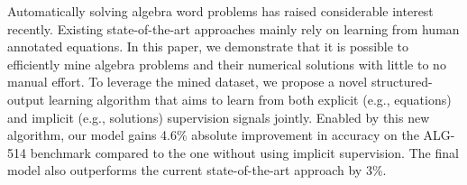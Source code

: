Automatically solving algebra word problems has raised considerable interest recently. Existing state-of-the-art approaches mainly rely on learning from human annotated equations. In this paper, we demonstrate that it is possible to efficiently mine algebra problems and their numerical solutions with little to no manual effort. To leverage the mined dataset, we propose a novel structured-output learning algorithm that aims to learn from both explicit (e.g., equations) and implicit (e.g., solutions) supervision signals jointly. Enabled by this new algorithm, our model gains 4.6\% absolute improvement in accuracy on the ALG-514 benchmark compared to the one without using implicit supervision. The final model also outperforms the current state-of-the-art approach by 3\%.
